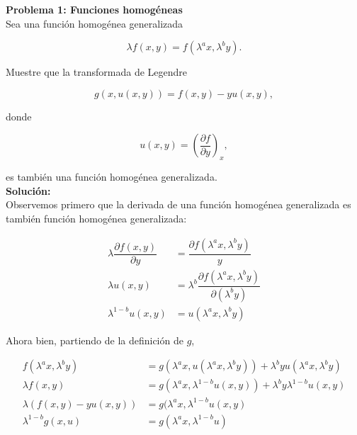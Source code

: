 \documentclass[10pt]{article}
\begin{document}
\textbf{Problema 1: Funciones homog\'eneas}
\\

Sea una funci\'on homog\'enea generalizada

\begin{equation}
\lambda f(x, y) = f(\lambda^a x, \lambda^b y).
\end{equation}

Muestre que la transformada de Legendre 

\begin{equation}
g(x, u(x,y)) = f(x, y) - y u(x, y),
\end{equation}

donde 

\begin{equation}
u(x, y) = \left(\dfrac{\partial f}{\partial y} \right)_x,
\end{equation}

es tambi\'en una funci\'on homog\'enea generalizada.\\

\textbf{Soluci\'on:}
\\

Observemos primero que la derivada de una funci\'on homog\'enea generalizada es tambi\'en funci\'on homog\'enea generalizada:

\begin{align*}
\lambda \dfrac{\partial f(x, y)}{\partial y} &= \dfrac{\partial f(\lambda^a x, \lambda^b y)}{y} \\
\lambda u(x, y) &= \lambda^b \dfrac{\partial f(\lambda^a x, \lambda^b y)}{\partial (\lambda^b y)} \\
\lambda^{1-b} u(x, y) &= u(\lambda^a x, \lambda^b y)
\end{align*}

Ahora bien, partiendo de la definici\'on de $g$,

\begin{align*}
f(\lambda^a x, \lambda^b y) &= g(\lambda^a x, u(\lambda^a x,\lambda^b y)) + \lambda^b y u(\lambda^a x, \lambda^b y) \\
\lambda f(x, y) &= g(\lambda^a x, \lambda^{1-b} u(x, y)) + \lambda^b y \lambda^{1-b} u(x, y) \\
\lambda \left( f(x, y) - y u(x, y) \right) &= g(\lambda^a x, \lambda^{1-b} u(x, y) \\
\lambda^{1-b} g(x, u) &= g(\lambda^a x, \lambda^{1-b} u)
\end{align*}

\pagebreak
\end{document}
